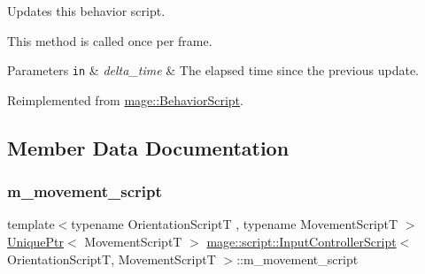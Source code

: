 Updates this behavior script.

This method is called once per frame.


\begin{DoxyParams}[1]{Parameters}
\mbox{\tt in}  & {\em delta\+\_\+time} & The elapsed time since the previous update. \\
\hline
\end{DoxyParams}


Reimplemented from \hyperlink{classmage_1_1_behavior_script_afb9cf3759edf8876416d1df85489cba6}{mage\+::\+Behavior\+Script}.



\subsection{Member Data Documentation}
\hypertarget{classmage_1_1script_1_1_input_controller_script_a72ff512de7a05d89d747fcbfc3c1ddc9}{}\label{classmage_1_1script_1_1_input_controller_script_a72ff512de7a05d89d747fcbfc3c1ddc9} 
\subsubsection{\texorpdfstring{m\+\_\+movement\+\_\+script}{m\_movement\_script}}
{\footnotesize\ttfamily template$<$typename Orientation\+ScriptT , typename Movement\+ScriptT $>$ \\
\hyperlink{namespacemage_a3316d7143a973e37adf1110f2e80ca31}{Unique\+Ptr}$<$ Movement\+ScriptT $>$ \hyperlink{classmage_1_1script_1_1_input_controller_script}{mage\+::script\+::\+Input\+Controller\+Script}$<$ Orientation\+ScriptT, Movement\+ScriptT $>$\+::m\+\_\+movement\+\_\+script\hspace{0.3cm}{\ttfamily [private]}}

\hypertarget{classmage_1_1script_1_1_input_controller_script_a74df197b5683c4aba93d1c5791b03de7}{}\label{classmage_1_1script_1_1_input_controller_script_a74df197b5683c4aba93d1c5791b03de7} 
